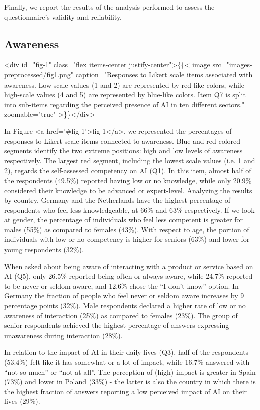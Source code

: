 \documentclass{article}
\begin{document}
Finally, we report the results of the analysis performed to assess the questionnaire's validity and reliability. 

\subsection{Awareness}

<div id="fig-1" class="flex items-center justify-center">\{\{< image src="images-preprocessed/fig1.png" caption="Responses to Likert scale items associated with awareness. Low-scale values (1 and 2) are represented by red-like colors, while high-scale values (4 and 5) are represented by blue-like colors. Item Q7 is split into sub-items regarding the perceived presence of AI in ten different sectors." zoomable="true" >\}\}</div>



In Figure <a href='#fig-1'>fig-1</a>, we represented the percentages of responses to Likert scale items connected to awareness. Blue and red colored segments identify the two extreme positions: high and low levels of awareness respectively. 
The largest red segment, including the lowest scale values (i.e. 1 and 2), regards the self-assessed competency on AI (Q1). In this item, almost half of the respondents (49.5\%) reported having low or no knowledge, while only 20.9\% considered their knowledge to be advanced or expert-level.
Analyzing the results by country, Germany and the Netherlands have the highest percentage of respondents who feel less knowledgeable, at 66\% and 63\% respectively. If we look at gender, the percentage of individuals who feel less competent is greater for males (55\%) as compared to females (43\%). With respect to age, the portion of individuals with low or no competency is higher for seniors (63\%) and lower for young respondents (32\%).

When asked about being aware of interacting with a product or service based on AI (Q5), only 26.5\% reported being often or always aware, while 24.7\% reported to be never or seldom aware, and 12.6\% chose the ``I don't know'' option. In Germany the fraction of people who feel never or seldom aware increases by 9 percentage points (32\%). Male respondents declared a higher rate of low or no awareness of interaction (25\%) as compared to females (23\%). The group of senior respondents achieved the highest percentage of answers expressing unawareness during interaction (28\%). 

In relation to the impact of AI in their daily lives (Q3), half of the respondents (53.4\%) felt like it has somewhat or a lot of impact,
while 16.7\% answered with ``not so much'' or ``not at all''. The perception of (high) impact is greater in Spain (73\%) and lower in Poland (33\%) - the latter is also the country in which there is the highest fraction of answers reporting a low perceived impact of AI on their lives (29\%).
\end{document}
